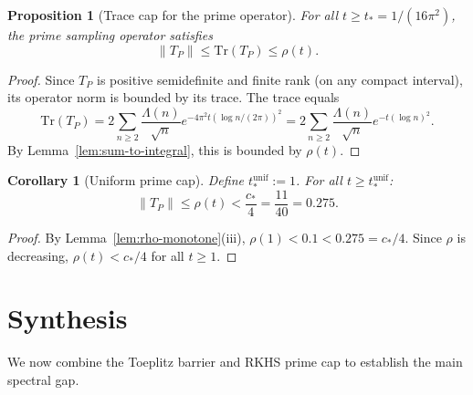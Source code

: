 \documentclass[11pt,a4paper]{article}
\newtheorem{proposition}[theorem]{Proposition}
\newtheorem{corollary}[theorem]{Corollary}
\theoremstyle{definition}
\theoremstyle{remark}
\begin{document}
\begin{proposition}[Trace cap for the prime operator]\label{prop:trace-cap}
For all $t \geq t_* = 1/(16\pi^2)$, the prime sampling operator satisfies
\begin{equation}\label{eq:trace-cap}
  \|T_P\| \leq \mathrm{Tr}(T_P) \leq \rho(t).
\end{equation}
\end{proposition}

\begin{proof}
Since $T_P$ is positive semidefinite and finite rank (on any compact interval), its operator norm is bounded by its trace. The trace equals
\[
  \mathrm{Tr}(T_P) = 2 \sum_{n \geq 2} \frac{\Lambda(n)}{\sqrt{n}} e^{-4\pi^2 t (\log n/(2\pi))^2}
  = 2 \sum_{n \geq 2} \frac{\Lambda(n)}{\sqrt{n}} e^{-t (\log n)^2}.
\]
By Lemma~\ref{lem:sum-to-integral}, this is bounded by $\rho(t)$.
\end{proof}

\begin{corollary}[Uniform prime cap]\label{cor:prime-cap}
Define $t_*^{\mathrm{unif}} := 1$. For all $t \geq t_*^{\mathrm{unif}}$:
\begin{equation}\label{eq:uniform-cap}
  \|T_P\| \leq \rho(t) < \frac{c_*}{4} = \frac{11}{40} = 0.275.
\end{equation}
\end{corollary}

\begin{proof}
By Lemma~\ref{lem:rho-monotone}(iii), $\rho(1) < 0.1 < 0.275 = c_*/4$. Since $\rho$ is decreasing, $\rho(t) < c_*/4$ for all $t \geq 1$.
\end{proof}

\section{Synthesis}\label{sec:synthesis}

We now combine the Toeplitz barrier and RKHS prime cap to establish the main spectral gap.
\end{document}
